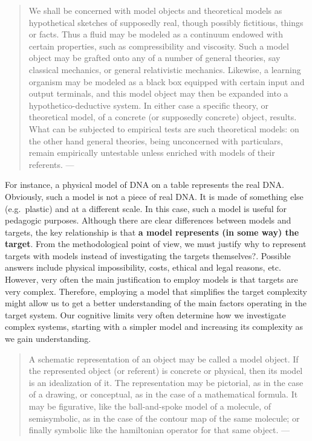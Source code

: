 \documentclass[
]{book}
\begin{document}
\begin{quote}
We shall be concerned with model objects and theoretical models as hypothetical sketches of supposedly real, though possibly fictitious, things or facts. Thus a fluid may be modeled as a continuum endowed with certain properties, such as compressibility and viscosity. Such a model object may be grafted onto any of a number of general theories, say classical mechanics, or general relativistic mechanics. Likewise, a learning organism may be modeled as a black box equipped with certain input and output terminals, and this model object may then be expanded into a hypothetico-deductive system. In either case a specific theory, or theoretical model, of a concrete (or supposedly concrete) object, results. What can be subjected to empirical tests are such theoretical models: on the other hand general theories, being unconcerned with particulars, remain empirically untestable unless enriched with models of their referents. --- \citep{bunge2012method}
\end{quote}

For instance, a physical model of DNA on a table represents the real DNA. Obviously, such a model is not a piece of real DNA. It is made of something else (e.g.~plastic) and at a different scale. In this case, such a model is useful for pedagogic purposes. Although there are clear differences between models and targets, the key relationship is that \textbf{a model represents (in some way) the target}. From the methodological point of view, we must justify why to represent targets with models instead of investigating the targets themselves?. Possible answers include physical impossibility, costs, ethical and legal reasons, etc. However, very often the main justification to employ models is that targets are very complex. Therefore, employing a model that simplifies the target complexity might allow us to get a better understanding of the main factors operating in the target system. Our cognitive limits very often determine how we investigate complex systems, starting with a simpler model and increasing its complexity as we gain understanding.

\begin{quote}
A schematic representation of an object may be called a model object. If the represented object (or referent) is concrete or physical, then its model is an idealization of it. The representation may be pictorial, as in the case of a drawing, or conceptual, as in the case of a mathematical formula. It may be figurative, like the ball-and-spoke model of a molecule, of semisymbolic, as in the case of the contour map of the same molecule; or finally symbolic like the hamiltonian operator for that same object. --- \citep{bunge2012method}
\end{quote}
\end{document}
